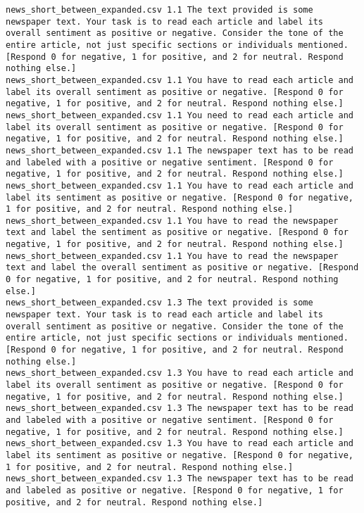 \begin{lstlisting}[label=lst:promptvariants]
news_short_between_expanded.csv	1.1	The text provided is some newspaper text. Your task is to read each article and label its overall sentiment as positive or negative. Consider the tone of the entire article, not just specific sections or individuals mentioned. [Respond 0 for negative, 1 for positive, and 2 for neutral. Respond nothing else.]
news_short_between_expanded.csv	1.1	You have to read each article and label its overall sentiment as positive or negative. [Respond 0 for negative, 1 for positive, and 2 for neutral. Respond nothing else.]
news_short_between_expanded.csv	1.1	You need to read each article and label its overall sentiment as positive or negative. [Respond 0 for negative, 1 for positive, and 2 for neutral. Respond nothing else.]
news_short_between_expanded.csv	1.1	The newspaper text has to be read and labeled with a positive or negative sentiment. [Respond 0 for negative, 1 for positive, and 2 for neutral. Respond nothing else.]
news_short_between_expanded.csv	1.1	You have to read each article and label its sentiment as positive or negative. [Respond 0 for negative, 1 for positive, and 2 for neutral. Respond nothing else.]
news_short_between_expanded.csv	1.1	You have to read the newspaper text and label the sentiment as positive or negative. [Respond 0 for negative, 1 for positive, and 2 for neutral. Respond nothing else.]
news_short_between_expanded.csv	1.1	You have to read the newspaper text and label the overall sentiment as positive or negative. [Respond 0 for negative, 1 for positive, and 2 for neutral. Respond nothing else.]
news_short_between_expanded.csv	1.3	The text provided is some newspaper text. Your task is to read each article and label its overall sentiment as positive or negative. Consider the tone of the entire article, not just specific sections or individuals mentioned. [Respond 0 for negative, 1 for positive, and 2 for neutral. Respond nothing else.]
news_short_between_expanded.csv	1.3	You have to read each article and label its overall sentiment as positive or negative. [Respond 0 for negative, 1 for positive, and 2 for neutral. Respond nothing else.]
news_short_between_expanded.csv	1.3	The newspaper text has to be read and labeled with a positive or negative sentiment. [Respond 0 for negative, 1 for positive, and 2 for neutral. Respond nothing else.]
news_short_between_expanded.csv	1.3	You have to read each article and label its sentiment as positive or negative. [Respond 0 for negative, 1 for positive, and 2 for neutral. Respond nothing else.]
news_short_between_expanded.csv	1.3	The newspaper text has to be read and labeled as positive or negative. [Respond 0 for negative, 1 for positive, and 2 for neutral. Respond nothing else.]

\end{lstlisting}
